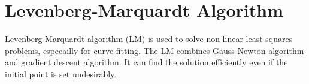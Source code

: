 \documentclass{turgon}
\begin{document}
\chapter{Levenberg-Marquardt Algorithm}

Levenberg-Marquardt algorithm (LM) is used to solve non-linear least squares problems, especailly for curve fitting. The
LM combines Gauss-Newton algorithm and gradient descent algorithm. It can find the solution efficiently even if the
initial point is set undesirably.
\end{document}
